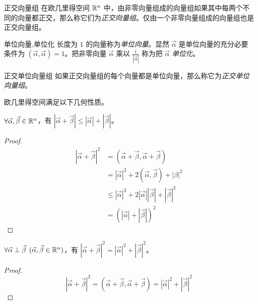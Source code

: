 \begin{definition}{正交向量组}
	在欧几里得空间 $\mathbb R^n$ 中，由非零向量组成的向量组如果其中每两个不同的向量都正交，那么称它们为\emph{正交向量组}。仅由一个非零向量组成的向量组也是正交向量组。
\end{definition}

\begin{definition}{单位向量,单位化}
	长度为 $1$ 的向量称为\emph{单位向量}。显然 $\vec \alpha$ 是单位向量的充分必要条件为 $(\vec \alpha, \vec \alpha) = 1$。把非零向量 $\vec \alpha$ 乘以 $\frac{1}{|\vec \alpha|}$ 称为把 $\vec \alpha$ \emph{单位化}。
\end{definition}

\begin{definition}{正交单位向量组}
	如果正交向量组的每个向量都是单位向量，那么称它为\emph{正交单位向量组}。
\end{definition}

欧几里得空间满足以下几何性质。

\begin{theorem}[三角形不等式]
	$\forall \vec \alpha, \vec \beta \in \mathbb R^n$，有 $|\vec \alpha + \vec \beta| \le |\vec \alpha| + |\vec \beta|$。
\end{theorem}

\begin{proof}
	$$
	\begin{aligned}
		|\vec \alpha + \vec \beta|^2 &= (\vec \alpha + \vec \beta, \vec \alpha + \vec \beta)
		\\&=
		|\vec \alpha|^2 + 2 (\vec \alpha, \vec \beta) + |\beta|^2
		\\&\le
		|\vec \alpha|^2 + 2|\vec \alpha||\vec \beta| + |\vec \beta|^2
		\\&=
		(|\vec \alpha| + |\vec \beta|)^2
	\end{aligned}
	$$
\end{proof}

\begin{theorem}[勾股定理]
	$\forall \vec \alpha \perp \vec \beta \pod{\vec \alpha, \vec \beta \in \mathbb R^n}$，有 $|\vec \alpha + \vec \beta|^2 = |\vec \alpha|^2 + |\vec \beta|^2$。
\end{theorem}

\begin{proof}
	$$
	|\vec \alpha + \vec \beta|^2 = (\vec \alpha + \vec \beta, \vec \alpha + \vec \beta) = |\vec \alpha|^2 + |\vec \beta|^2
	$$
\end{proof}
